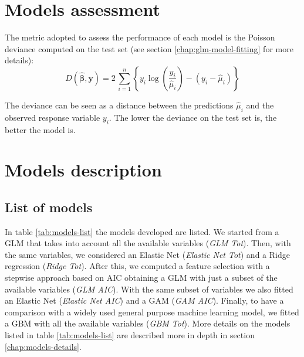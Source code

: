 \documentclass[a4paper, twoside, openright, 12pt]{report}
\theoremstyle{definition}
\theoremstyle{definition}
\theoremstyle{definition}
\theoremstyle{remark}
\begin{document}
\hypertarget{models-assessment}{%
\section{Models assessment}\label{models-assessment}}

The metric adopted to assess the performance of each model is the Poisson deviance computed on the test set (see section \ref{chap:glm-model-fitting} for more details):
\[
D(\hat{\boldsymbol{\beta}}, \boldsymbol{y}) = 2\,\sum_{i=1}^{n}{\left\{ y_i \log{\left(\frac{y_i}{\hat{\mu}_i}\right)} - \left( y_i - \hat{\mu}_i \right) \right\}}
\]

The deviance can be seen as a distance between the predictions \(\hat{\mu}_i\) and the observed response variable \(y_i\). The lower the deviance on the test set is, the better the model is.

\hypertarget{models-description}{%
\section{Models description}\label{models-description}}

\hypertarget{list-of-models}{%
\subsection{List of models}\label{list-of-models}}

In table \ref{tab:models-list} the models developed are listed. We started from a GLM that takes into account all the available variables (\emph{GLM Tot}). Then, with the same variables, we considered an Elastic Net (\emph{Elastic Net Tot}) and a Ridge regression (\emph{Ridge Tot}). After this, we computed a feature selection with a stepwise approach based on AIC obtaining a GLM with just a subset of the available variables (\emph{GLM AIC}). With the same subset of variables we also fitted an Elastic Net (\emph{Elastic Net AIC}) and a GAM (\emph{GAM AIC}). Finally, to have a comparison with a widely used general purpose machine learning model, we fitted a GBM with all the available variables (\emph{GBM Tot}). More details on the models listed in table \ref{tab:models-list} are described more in depth in section \ref{chap:models-details}.
\end{document}
